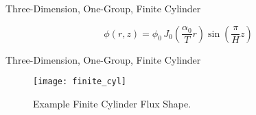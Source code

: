 \begin{frame}{Three-Dimension, One-Group, Finite Cylinder}
  \begin{table}
    \label{tab:finite_cyl}
    \begin{center}
    \end{center}
  \end{table}
  \begin{equation}
    \label{eq:analytic_finite_cyl}
    \phi(r,z) = \phi_0 \, 
      J_0\left(\frac{\alpha_0}{T} r\right) \sin\left(\frac{\pi}{H} z \right)
  \end{equation}
\end{frame}

\begin{frame}{Three-Dimension, One-Group, Finite Cylinder}
  \begin{figure}
    \centering
    \texttt{[image: finite\_cyl]}
    \caption{Example Finite Cylinder Flux Shape.}
    \label{fig:finite_cyl}
  \end{figure}
\end{frame}

